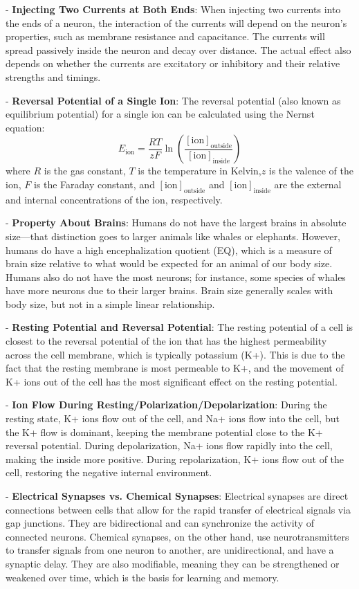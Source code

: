 \documentclass{article}
\begin{document}
- \textbf{Injecting Two Currents at Both Ends}: When injecting two currents into the ends of a neuron, the interaction of the currents will depend on the neuron's properties, such as membrane resistance and capacitance. The currents will spread passively inside the neuron and decay over distance. The actual effect also depends on whether the currents are excitatory or inhibitory and their relative strengths and timings.

- \textbf{Reversal Potential of a Single Ion}: The reversal potential (also known as equilibrium potential) for a single ion can be calculated using the Nernst equation:
\[
E_{\text{ion}} = \frac{RT}{zF} \ln\left(\frac{[\text{ion}]_{\text{outside}}}{[\text{ion}]_{\text{inside}}}\right)
\]
where $R$ is the gas constant, $T$ is the temperature in Kelvin,$z$ is the valence of the ion, $F$ is the Faraday constant, and $[\text{ion}]_{\text{outside}}$ and $[\text{ion}]_{\text{inside}}$ are the external and internal concentrations of the ion, respectively.

- \textbf{Property About Brains}: Humans do not have the largest brains in absolute size—that distinction goes to larger animals like whales or elephants. However, humans do have a high encephalization quotient (EQ), which is a measure of brain size relative to what would be expected for an animal of our body size. Humans also do not have the most neurons; for instance, some species of whales have more neurons due to their larger brains. Brain size generally scales with body size, but not in a simple linear relationship.

- \textbf{Resting Potential and Reversal Potential}: The resting potential of a cell is closest to the reversal potential of the ion that has the highest permeability across the cell membrane, which is typically potassium (K+). This is due to the fact that the resting membrane is most permeable to K+, and the movement of K+ ions out of the cell has the most significant effect on the resting potential.

- \textbf{Ion Flow During Resting/Polarization/Depolarization}: During the resting state, K+ ions flow out of the cell, and Na+ ions flow into the cell, but the K+ flow is dominant, keeping the membrane potential close to the K+ reversal potential. During depolarization, Na+ ions flow rapidly into the cell, making the inside more positive. During repolarization, K+ ions flow out of the cell, restoring the negative internal environment.

- \textbf{Electrical Synapses vs. Chemical Synapses}: Electrical synapses are direct connections between cells that allow for the rapid transfer of electrical signals via gap junctions. They are bidirectional and can synchronize the activity of connected neurons. Chemical synapses, on the other hand, use neurotransmitters to transfer signals from one neuron to another, are unidirectional, and have a synaptic delay. They are also modifiable, meaning they can be strengthened or weakened over time, which is the basis for learning and memory.
\end{document}
